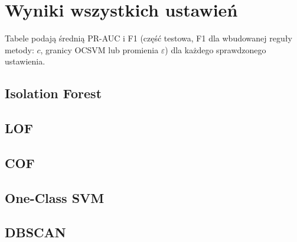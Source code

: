 \documentclass[11pt,a4paper]{article}
\begin{document}
\appendix
\FloatBarrier
\section{Wyniki wszystkich ustawień}
\label{app:grid}

Tabele podają średnią PR-AUC i F1 (część testowa, F1 dla wbudowanej reguły
metody: $c$, granicy OCSVM lub promienia $\varepsilon$) dla każdego
sprawdzonego ustawienia.

{\scriptsize
\setlength{\tabcolsep}{4pt}
\subsection*{Isolation Forest}
\subsection*{LOF}
\subsection*{COF}
\subsection*{One-Class SVM}
\subsection*{DBSCAN}
}
\end{document}
